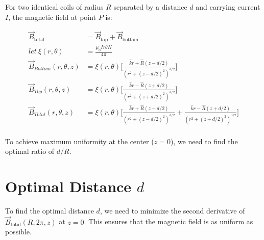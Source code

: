 For two identical coils of radius \( R \) separated by a distance \( d \) and carrying current \( I \), the magnetic field at point \( P \) is:

\begin{align*}
    \vec{B}_{\text{total}} &= \vec{B}_{\text{top}} + \vec{B}_{\text{bottom}} \\
    let~\xi(r, \theta) &= \frac{\mu_{0}Ir\theta N}{4\pi} \\
    \vec{B}_{Bottom}(r,\theta,z) &=\xi(r, \theta)\bigg[\frac{\hat{k}r+\hat{R}(z-d/2)}{(r^2+(z-d/2)^2)^{3/2}}\bigg] \\
    \vec{B}_{Top}(r,\theta,z) &=\xi(r, \theta)\bigg[\frac{\hat{k}r-\hat{R}(z+d/2)}{(r^2+(z+d/2)^2)^{3/2}}\bigg] \\
    \vec{B}_{Total}(r,\theta,z) &=\xi(r, \theta)\bigg[\frac{\hat{k}r+\hat{R}(z-d/2)}{(r^2+(z-d/2)^2)^{3/2}}+\frac{\hat{k}r-\hat{R}(z+d/2)}{(r^2+(z+d/2)^2)^{3/2}}\bigg] \\
\end{align*}

To achieve maximum uniformity at the center (\( z = 0 \)), we need to find the optimal ratio of \( d/R \).

\newpage{}
\thispagestyle{plain}

\section{Optimal Distance \( d \)}
To find the optimal distance \( d \), we need to minimize the second derivative of \( \vec{B}_{\text{total}}(R, 2\pi, z) \) at \( z = 0 \). This ensures that the magnetic field is as uniform as possible.

